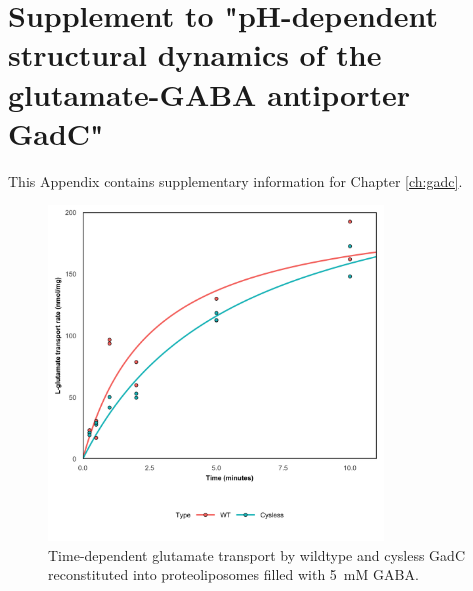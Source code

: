 \clearpage %

\chapter{Supplement to "pH-dependent structural dynamics of the glutamate-GABA antiporter GadC"} \label{app:gadc_supp}

This Appendix contains supplementary information for Chapter \ref{ch:gadc}.

\begin{figure}[h]
\centering
\includegraphics[width=3.5in]{Figures/gadc_supp_time_transport.png}
\caption[Time-dependent glutamate transport by wildtype and cysless GadC reconstituted into proteoliposomes filled with GABA.]{Time-dependent glutamate transport by wildtype and cysless GadC reconstituted into proteoliposomes filled with \SI{5}{mM} GABA.}
\label{fig:gadc_supp_time_transport}
\end{figure}

